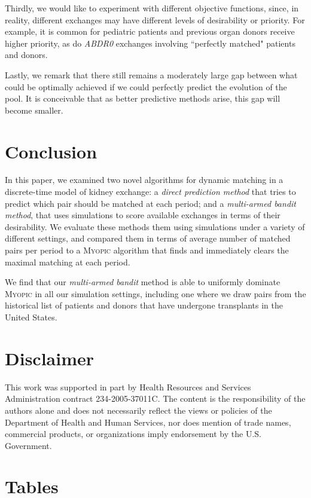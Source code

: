\begin{itemize}
Thirdly, we would like to experiment with different objective functions, since, in reality, different exchanges may have different levels of desirability or priority. For example, it is common for pediatric patients and previous organ donors receive higher priority, as do \emph{ABDR0} exchanges involving ``perfectly matched" patients and donors.

Lastly, we remark that there still remains a moderately large gap between what could be optimally achieved if we could perfectly predict the evolution of the pool. It is conceivable that as better predictive methods arise, this gap will become smaller. 


\section{Conclusion}

In this paper, we examined two novel algorithms for dynamic matching in a discrete-time model of kidney exchange: a \emph{direct prediction method} that tries to predict which pair should be matched at each period; and a \emph{multi-armed bandit method}, that uses simulations to score available exchanges in terms of their desirability. We evaluate these methods them using simulations under a variety of different settings, and compared them in terms of average number of matched pairs per period to a \textsc{Myopic} algorithm that finds and immediately clears the maximal matching at each period.
  
We find that our \emph{multi-armed bandit} method is able to uniformly dominate \textsc{Myopic} in all our simulation settings, including one where we draw pairs from the historical list of patients and donors that have undergone transplants in the United States.

\section*{Disclaimer}

This work was supported in part by Health Resources and Services Administration contract 234-2005-37011C. The content is the responsibility of the authors alone and does not necessarily reflect the views or policies of the Department of Health and Human Services, nor does mention of trade names, commercial products, or organizations imply endorsement by the U.S. Government.

	
\section{Tables}


\end{itemize}
